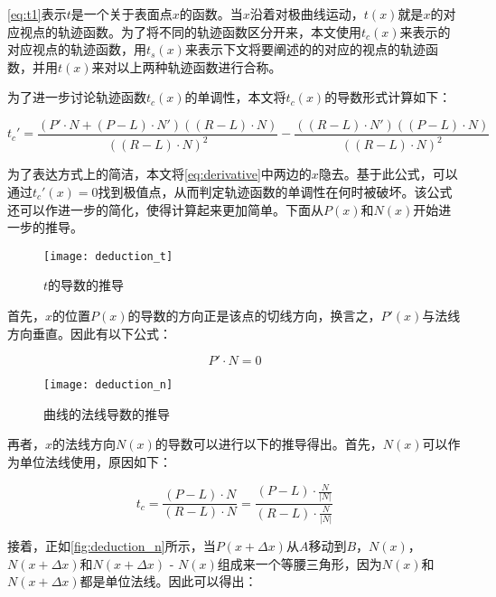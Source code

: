 \autoref{eq:t1}表示$t$是一个关于表面点$x$的函数。当$x$沿着对极曲线运动，$t(x)$就是\conp{}$x$的对应视点的轨迹函数。为了将不同的轨迹函数区分开来，本文使用$t_c(x)$来表示\conp{}的对应视点的轨迹函数，用$t_s(x)$来表示下文将要阐述的\sconp{}的对应的视点的轨迹函数，并用$t(x)$来对以上两种轨迹函数进行合称。

为了进一步讨论轨迹函数$t_c(x)$的单调性，本文将$t_c(x)$的导数形式计算如下：

\begin{equation}\label{eq:derivative}
  t_c' = \frac{(P'\cdot{N}+(P-L)\cdot{N'})((R-L)\cdot{N})}{((R-L)\cdot{N})^2}-\frac{((R-L)\cdot{N'})((P-L)\cdot{N})}{((R-L)\cdot{N})^2}
\end{equation}

为了表达方式上的简洁，本文将\autoref{eq:derivative}中两边的$x$隐去。基于此公式，可以通过$t_c'(x)=0$找到极值点，从而判定轨迹函数的单调性在何时被破坏。该公式还可以作进一步的简化，使得计算起来更加简单。下面从$P(x)$和$N(x)$开始进一步的推导。

\begin{figure}[bth]
    \centering
    \texttt{[image: deduction\_t]}
    \caption{\label{fig:deduction_t}
    $t$的导数的推导}
\end{figure}  

首先，$x$的位置$P(x)$的导数的方向正是该点的切线方向，换言之，$P'(x)$与法线方向垂直。因此有以下公式：

\begin{equation}\label{eq:perp}
    P'\cdot{N} = 0
\end{equation}

\begin{figure}[bth]
    \centering
    \texttt{[image: deduction\_n]}
    \caption{\label{fig:deduction_n}
    曲线的法线导数的推导}
\end{figure}

再者，$x$的法线方向$N(x)$的导数可以进行以下的推导得出。首先，$N(x)$可以作为单位法线使用，原因如下：

\begin{equation}
    t_c = \frac{(P-L)\cdot{N}}{(R-L)\cdot{N}} = \frac{(P-L)\cdot{\frac{N}{|N|}}}{(R-L)\cdot{\frac{N}{|N|}}}
\end{equation}

接着，正如\autoref{fig:deduction_n}所示，当$P(x+\Delta x)$从$A$移动到$B$，$N(x)$，$N(x+\Delta x)$和$N(x+\Delta x)$ - $N(x)$组成来一个等腰三角形，因为$N(x)$和$N(x+\Delta x)$都是单位法线。因此可以得出：

